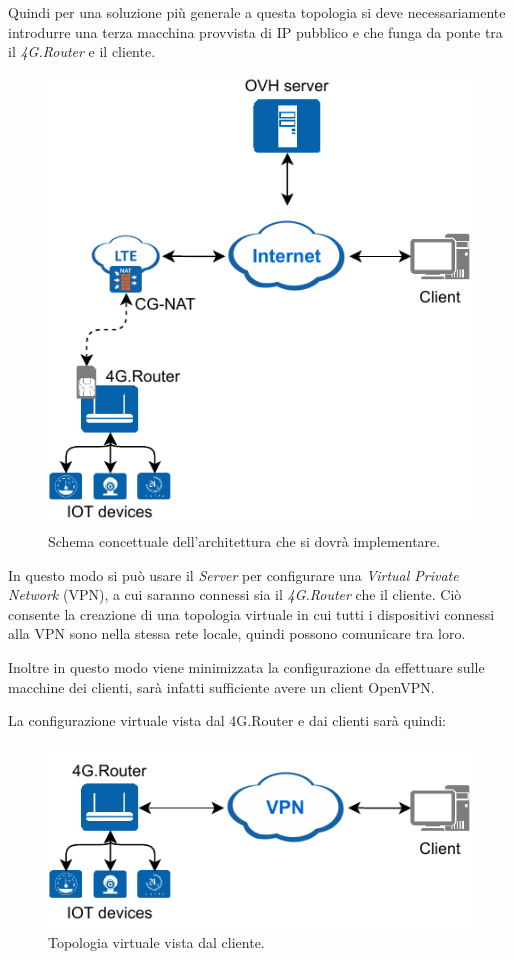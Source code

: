 \newpage
Quindi per una soluzione più generale a questa topologia si deve necessariamente introdurre una terza macchina provvista di IP pubblico e che funga da ponte tra il \textit{4G.Router} e il cliente.


\begin{figure}[H]
	\centering
	\includegraphics[width=0.5\linewidth]{immagini/diag-real}
	\caption{Schema concettuale dell'architettura che si dovrà implementare.}
	\label{fig:schem_architettura_reale}
\end{figure}

In questo modo si può usare il \textit{Server} per configurare una \textit{Virtual Private Network} (VPN), a cui saranno connessi sia il \textit{4G.Router} che il cliente. Ciò consente la creazione di una topologia virtuale in cui tutti i dispositivi connessi alla VPN sono nella stessa rete locale, quindi possono comunicare tra loro.

Inoltre in questo modo viene minimizzata la configurazione da effettuare sulle macchine dei clienti, sarà infatti sufficiente avere un client OpenVPN.

La configurazione virtuale vista dal 4G.Router e dai clienti sarà quindi:

\begin{figure}[H]
	\centering
	\includegraphics[width=0.5\linewidth]{immagini/diag-virtual}
	\caption{Topologia virtuale vista dal cliente.}
	\label{fig:schema_architettura_virtuale}
\end{figure}

\newpage
